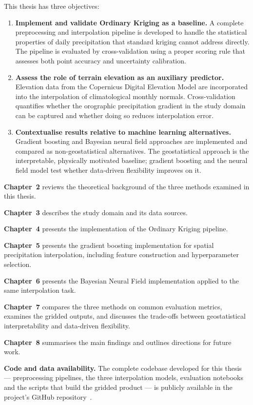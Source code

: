 This thesis has three objectives:

\begin{enumerate}
    \item \textbf{Implement and validate Ordinary Kriging as a baseline.}
    A complete preprocessing and interpolation pipeline is developed to handle
    the statistical properties of daily precipitation that standard kriging
    cannot address directly.
    The pipeline is evaluated by cross-validation using a proper scoring
    rule that assesses both point accuracy and uncertainty calibration.

    \item \textbf{Assess the role of terrain elevation as an auxiliary predictor.}
    Elevation data from the Copernicus Digital Elevation Model are incorporated
    into the interpolation of climatological monthly normals.
    Cross-validation quantifies whether the orographic precipitation gradient
    in the study domain can be captured and whether doing so reduces
    interpolation error.

    \item \textbf{Contextualise results relative to machine learning alternatives.}
    Gradient boosting and Bayesian neural field approaches are implemented
    and compared as non-geostatistical alternatives.
    The geostatistical approach is the interpretable, physically motivated
    baseline; gradient boosting and the neural field model test whether
    data-driven flexibility improves on it.
\end{enumerate}

\textbf{Chapter~2} reviews the theoretical background of the three methods examined in this thesis.

\textbf{Chapter~3} describes the study domain and its data sources.

\textbf{Chapter~4} presents the implementation of the Ordinary Kriging pipeline.

\textbf{Chapter~5} presents the gradient boosting implementation for
spatial precipitation interpolation, including feature construction and
hyperparameter selection.

\textbf{Chapter~6} presents the Bayesian Neural Field implementation
applied to the same interpolation task.

\textbf{Chapter~7} compares the three methods on common evaluation metrics,
examines the gridded outputs, and discusses the trade-offs between
geostatistical interpretability and data-driven flexibility.

\textbf{Chapter~8} summarises the main findings and outlines directions for
future work.

\bigskip
\noindent\textbf{Code and data availability.}
The complete codebase developed for this thesis — preprocessing
pipelines, the three interpolation models, evaluation notebooks and
the scripts that build the gridded product — is publicly available in
the project's GitHub repository~\cite{thesisRepo}.
